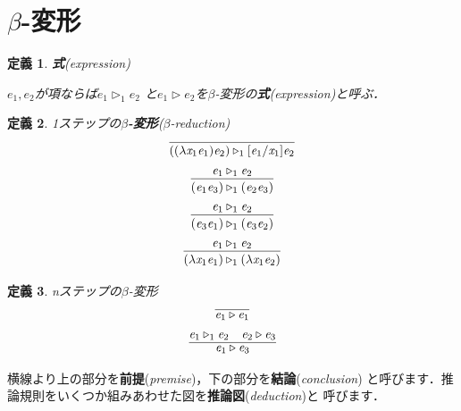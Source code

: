 \documentclass{ltjsbook}%
\newtheorem{definition}{定義}[section]%
\newcommand\term[2]{\textbf{#1}{(\textit{#2})}}%
\begin{document}
\section{$\beta$-変形}%
\label{sect:beta}%
\begin{definition}%
  \term{式}{expression}%
  \par$\mathit{e}_1,\mathit{e}_2$が項ならば$\mathit{e}_1\triangleright_1\mathit{e}_2$%
  と$\mathit{e}_1\triangleright\mathit{e}_2$を$\beta$-変形の\term{式}{expression}と呼ぶ．%
\end{definition}%
\begin{definition}%
1ステップの\term{$\beta$-変形}{$\beta$-reduction}%
\begin{equation}%
  \infer{%
    ((\lambda\mathit{x}_1\mathit{e}_1)\mathit{e}_2)\triangleright_1%
    [\mathit{e}_1/\mathit{x}_1]\mathit{e}_2
  }{%
  }%
\end{equation}%
\begin{equation}%
  \infer{%
    (\mathit{e}_1\mathit{e}_3)\triangleright_1(\mathit{e}_2\mathit{e}_3)%
  }{%
    \mathit{e}_1\triangleright_1\mathit{e}_2%
  }%
\end{equation}%
\begin{equation}%
  \infer{%
    (\mathit{e}_3\mathit{e}_1)\triangleright_1(\mathit{e}_3\mathit{e}_2)%
  }{%
    \mathit{e}_1\triangleright_1\mathit{e}_2%
  }%
\end{equation}%
\begin{equation}%
  \infer{%
    (\lambda\mathit{x}_1\mathit{e}_1)\triangleright_1%
    (\lambda\mathit{x}_1\mathit{e}_2)%
  }{%
    \mathit{e}_1\triangleright_1\mathit{e}_2%
  }%
\end{equation}%
\end{definition}%
\begin{definition}%
nステップの$\beta$-変形%
\begin{equation}%
  \infer{%
    \mathit{e}_1\triangleright\mathit{e}_1%
  }{%
  }%
\end{equation}%
\begin{equation}%
  \infer{%
    \mathit{e}_1\triangleright\mathit{e}_3%
  }{%
    \mathit{e}_1\triangleright_1\mathit{e}_2%
  &%
    \mathit{e}_2\triangleright\mathit{e}_3%
  }%
\end{equation}%
\end{definition}%
\par 横線より上の部分を\term{前提}{premise}，下の部分を\term{結論}{conclusion}%
と呼びます．推論規則をいくつか組みあわせた図を\term{推論図}{deduction}と%
呼びます．
\end{document}
